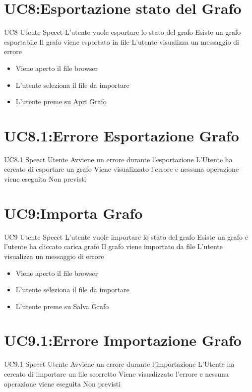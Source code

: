 \documentclass[../AnalisideiRequisiti.tex]{subfiles}
\begin{document}
\section{UC8:Esportazione stato del Grafo}
\UserCase
{UC8}
{Utente}
{Speect}
{L'utente vuole esportare lo stato del grafo}
{Esiste un grafo esportabile}
{Il grafo viene esportato in file}
{ L'utente visualizza un messaggio di errore }
{
	{\begin{itemize}
			\item{} Viene aperto il file browser
			\item{} L'utente seleziona il file da importare
			\item{} L'utente preme su Apri Grafo
\end{itemize}}}

\section{UC8.1:Errore Esportazione Grafo}
\UserCase
{UC8.1}
{Speect}
{Utente}
{Avviene un errore durante l'esportazione}
{L'Utente ha cercato di esportare un grafo}
{Viene visualizzato l'errore e nessuna operazione viene eseguita}
{Non previsti}
{}
\section{UC9:Importa Grafo}
\UserCase
{UC9}
{Utente}
{Speect}
{L'utente vuole importare lo stato del grafo}
{Esiste un grafo e l'utente ha cliccato carica grafo}
{Il grafo viene importato da file}
{L'utente visualizza un messaggio di errore }
{
	{\begin{itemize}
			\item{} Viene aperto il file browser
			\item{} L'utente seleziona il file da importare
			\item{} L'utente preme su Salva Grafo
\end{itemize}}}
\section{UC9.1:Errore Importazione Grafo}
\UserCase
{UC9.1}
{Speect}
{Utente}
{Avviene un errore durante l'importazione}
{L'Utente ha cercato di importare un file scorretto}
{Viene visualizzato l'errore e nessuna operazione viene eseguita}
{Non previsti}
{}
\end{document}
